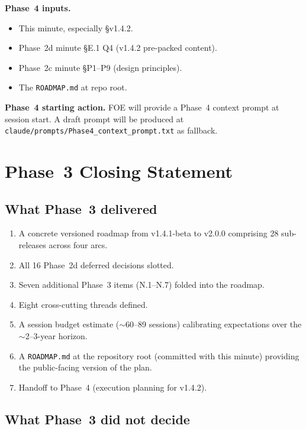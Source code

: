 \documentclass[11pt,a4paper]{article}
\begin{document}
\textbf{Phase~4 inputs.}
\begin{itemize}
    \item This minute, especially \S v1.4.2.
    \item Phase~2d minute \S E.1 Q4 (v1.4.2 pre-packed content).
    \item Phase~2c minute \S P1--P9 (design principles).
    \item The \texttt{ROADMAP.md} at repo root.
\end{itemize}

\textbf{Phase~4 starting action.} FOE will provide a Phase~4 context prompt at session start. A draft prompt will be produced at \texttt{claude/prompts/Phase4\_context\_prompt.txt} as fallback.

\section{Phase~3 Closing Statement}

\subsection{What Phase~3 delivered}

\begin{enumerate}
    \item A concrete versioned roadmap from v1.4.1-beta to v2.0.0 comprising 28 sub-releases across four arcs.
    \item All 16 Phase~2d deferred decisions slotted.
    \item Seven additional Phase~3 items (N.1--N.7) folded into the roadmap.
    \item Eight cross-cutting threads defined.
    \item A session budget estimate ($\sim$60--89 sessions) calibrating expectations over the $\sim$2--3-year horizon.
    \item A \texttt{ROADMAP.md} at the repository root (committed with this minute) providing the public-facing version of the plan.
    \item Handoff to Phase~4 (execution planning for v1.4.2).
\end{enumerate}

\subsection{What Phase~3 did not decide}
\end{document}
